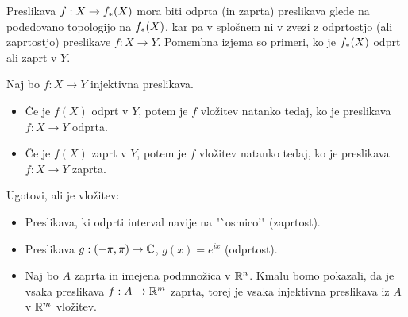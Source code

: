 Preslikava $f: X \to f_{*}(X)$ mora biti odprta (in zaprta) preslikava glede na podedovano topologijo na $f_{*}(X)$, kar pa v splošnem ni v zvezi z odprtostjo (ali zaprtostjo) preslikave $f: X \to Y$. Pomembna izjema so primeri, ko je $f_{*}(X)$ odprt ali zaprt v $Y$.

\begin{trditev}
    Naj bo $f: X \to Y$ injektivna preslikava.
    \begin{itemize}
        \item Če je $f(X)$ odprt v $Y$, potem je $f$ vložitev natanko tedaj, ko je preslikava $f: X \to Y$ odprta.
        \item Če je $f(X)$ zaprt v $Y$, potem je $f$ vložitev natanko tedaj, ko je preslikava $f: X \to Y$ zaprta.
    \end{itemize}
\end{trditev}

\begin{primer}
    Ugotovi, ali je vložitev:
    \begin{itemize}
        \item Preslikava, ki odprti interval navije na "`osmico'" (zaprtost).
        \item Preslikava $g: (-\pi, \pi) \to \mathbb{C}$, $g(x) = e^{ix}$ (odprtost).
        \item Naj bo $A$ zaprta in imejena podmnožica v $\mathbb{R}^n$. Kmalu bomo pokazali, da je vsaka preslikava $f: A \to \mathbb{R}^m$ zaprta, torej je vsaka injektivna preslikava iz $A$ v $\mathbb{R}^m$ vložitev.
    \end{itemize}
\end{primer}